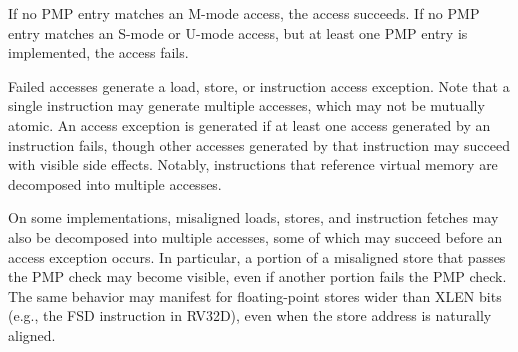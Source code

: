 If no PMP entry matches an M-mode access, the access succeeds.  If no PMP
entry matches an S-mode or U-mode access, but at least one PMP entry is
implemented, the access fails.

Failed accesses generate a load, store, or instruction access exception.  Note
that a single instruction may generate multiple accesses, which may not be
mutually atomic.  An access exception is generated if at least one access
generated by an instruction fails, though other accesses generated by that
instruction may succeed with visible side effects.  Notably, instructions that
reference virtual memory are decomposed into multiple accesses.

On some implementations, misaligned loads, stores, and instruction fetches may
also be decomposed into multiple accesses, some of which may succeed before an
access exception occurs.  In particular, a portion of a misaligned store
that passes the PMP check may become visible, even if another portion fails
the PMP check.  The same behavior may manifest for floating-point stores wider
than XLEN bits (e.g., the FSD instruction in RV32D), even when the store
address is naturally aligned.
